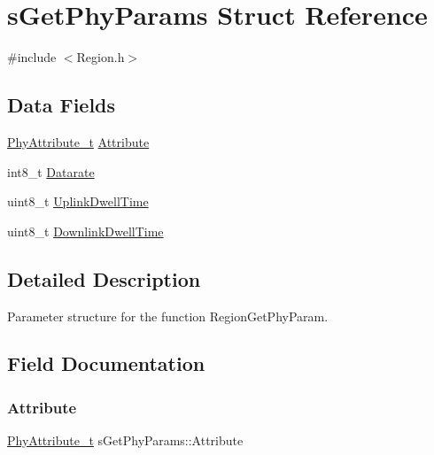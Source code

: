 \hypertarget{structsGetPhyParams}{}\section{s\+Get\+Phy\+Params Struct Reference}
\label{structsGetPhyParams}


{\ttfamily \#include $<$Region.\+h$>$}

\subsection*{Data Fields}
\begin{DoxyCompactItemize}
\item 
\hyperlink{group__REGION_ga9445b07fdf77581ecfaf389970e635f8}{Phy\+Attribute\+\_\+t} \hyperlink{structsGetPhyParams_a3b91f17df09464368991fb2eed20b6f8}{Attribute}
\item 
int8\+\_\+t \hyperlink{structsGetPhyParams_a61e3c3a6f1b2857333242fad7fd42263}{Datarate}
\item 
uint8\+\_\+t \hyperlink{structsGetPhyParams_ad59a5078532942653d4423c2bf128ed8}{Uplink\+Dwell\+Time}
\item 
uint8\+\_\+t \hyperlink{structsGetPhyParams_aeb0e2347bed31d4bf1cc490ba01ca523}{Downlink\+Dwell\+Time}
\end{DoxyCompactItemize}


\subsection{Detailed Description}
Parameter structure for the function Region\+Get\+Phy\+Param. 

\subsection{Field Documentation}
\mbox{\label{structsGetPhyParams_a3b91f17df09464368991fb2eed20b6f8}} 
\subsubsection{\texorpdfstring{Attribute}{Attribute}}
{\footnotesize\ttfamily \hyperlink{group__REGION_ga9445b07fdf77581ecfaf389970e635f8}{Phy\+Attribute\+\_\+t} s\+Get\+Phy\+Params\+::\+Attribute}

